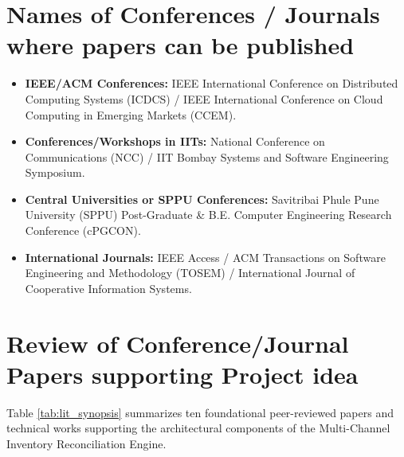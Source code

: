 \documentclass[oneside,a4paper,12pt]{report}
\begin{document}
\section{Names of Conferences / Journals where papers can be published}
\begin{itemize}
  \item \textbf{IEEE/ACM Conferences:} IEEE International Conference on Distributed Computing Systems (ICDCS) / IEEE International Conference on Cloud Computing in Emerging Markets (CCEM).
  \item \textbf{Conferences/Workshops in IITs:} National Conference on Communications (NCC) / IIT Bombay Systems and Software Engineering Symposium.
  \item \textbf{Central Universities or SPPU Conferences:} Savitribai Phule Pune University (SPPU) Post-Graduate \& B.E. Computer Engineering Research Conference (cPGCON).
  \item \textbf{International Journals:} IEEE Access / ACM Transactions on Software Engineering and Methodology (TOSEM) / International Journal of Cooperative Information Systems.
\end{itemize}

\section{Review of Conference/Journal Papers supporting Project idea}
\label{sec:survey}
Table \ref{tab:lit_synopsis} summarizes ten foundational peer-reviewed papers and technical works supporting the architectural components of the Multi-Channel Inventory Reconciliation Engine.
\end{document}
